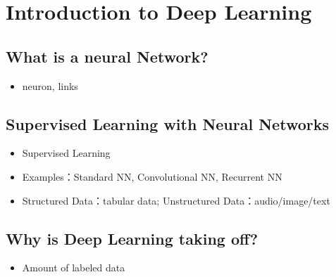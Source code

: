 \section{Introduction to Deep Learning}


\subsection{What is a neural Network?}
\begin{itemize}
	\item{neuron, links}
\end{itemize}


\subsection{Supervised Learning with Neural Networks}
\begin{itemize}
	\item{Supervised Learning}
	\item{Examples：Standard NN, Convolutional NN, Recurrent NN}
	\item{Structured Data：tabular data; Unstructured Data：audio/image/text}
\end{itemize}


\subsection{Why is Deep Learning taking off?}
\begin{itemize}
	\item{Amount of labeled data}
\end{itemize}